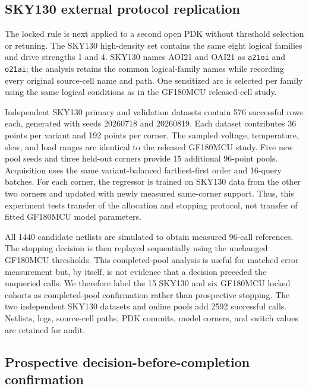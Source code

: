 \documentclass[preprint,12pt]{elsarticle}
\begin{document}
\subsection{SKY130 external protocol replication}

The locked rule is next applied to a second open PDK without threshold selection or retuning. The SKY130 high-density set contains the same eight logical families and drive strengths 1 and 4. SKY130 names AOI21 and OAI21 as \texttt{a21oi} and \texttt{o21ai}; the analysis retains the common logical-family names while recording every original source-cell name and path. One sensitized arc is selected per family using the same logical conditions as in the GF180MCU released-cell study.

Independent SKY130 primary and validation datasets contain 576 successful rows each, generated with seeds 20260718 and 20260819. Each dataset contributes 36 points per variant and 192 points per corner. The sampled voltage, temperature, slew, and load ranges are identical to the released GF180MCU study. Five new pool seeds and three held-out corners provide 15 additional 96-point pools. Acquisition uses the same variant-balanced farthest-first order and 16-query batches. For each corner, the regressor is trained on SKY130 data from the other two corners and updated with newly measured same-corner support. Thus, this experiment tests transfer of the allocation and stopping protocol, not transfer of fitted GF180MCU model parameters.

All 1440 candidate netlists are simulated to obtain measured 96-call references. The stopping decision is then replayed sequentially using the unchanged GF180MCU thresholds. This completed-pool analysis is useful for matched error measurement but, by itself, is not evidence that a decision preceded the unqueried calls. We therefore label the 15 SKY130 and six GF180MCU locked cohorts as completed-pool confirmation rather than prospective stopping. The two independent SKY130 datasets and online pools add 2592 successful calls. Netlists, logs, source-cell paths, PDK commits, model corners, and switch values are retained for audit.

\subsection{Prospective decision-before-completion confirmation}
\end{document}
